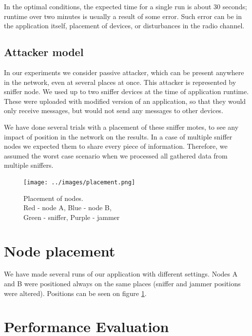 \documentclass[
  print, %
  Table,   %
  nolof,     %
  nolot,     %
           oneside
]{fithesis3}
\begin{document}
In the optimal conditions, the expected time for a single run is about 30 seconds; runtime over two minutes is usually a result of some error. Such error can be in the application itself, placement of devices, or disturbances in the radio channel.

\subsection{Attacker model}
  In our experiments we consider passive attacker, which can be present anywhere in the network, even at several places at once. This attacker is represented by sniffer node. We used up to two sniffer devices at the time of application runtime. These were uploaded with modified version of an application, so that they would only receive messages, but would not send any messages to other devices.

  We have done several trials with a placement of these sniffer motes, to see any impact of position in the network on the results. In a case of multiple sniffer nodes we expected them to share every piece of information. Therefore, we assumed the worst case scenario when we processed all gathered data from multiple sniffers.


  \begin{figure}
    \vspace{-50pt}
    \begin{center}
      \texttt{[image: ../images/placement.png]}
    \end{center}
    \caption{Placement of nodes. \\ Red - node A, Blue - node B, \\ Green - sniffer, Purple - jammer}
    \label{fig:placement}
    \vspace{-20pt}

  \end{figure}

\section{Node placement}

We have made several runs of our application with different settings. Nodes A and B were positioned always on the same places (sniffer and jammer positions were altered). Positions can be seen on figure \ref{fig:placement}.



  \section{Performance Evaluation}\label{sec:results}
\end{document}
